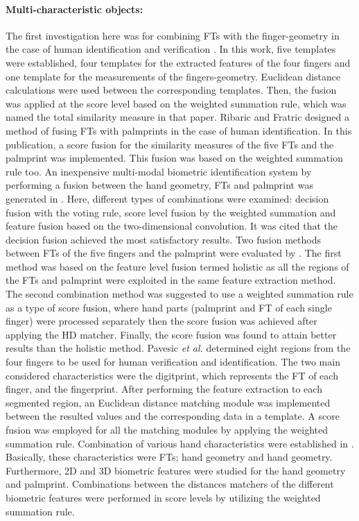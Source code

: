 \documentclass[review]{elsarticle}
\begin{document}
	\paragraph{\textbf{Multi-characteristic objects:}} The first investigation here was for combining FTs with the finger-geometry in the case of human identification and verification \cite{Ribaric2005Anonline}. In this work, five templates were established, four templates for the extracted features of the four fingers and one template for the measurements of the fingers-geometry. Euclidean distance calculations were used between the corresponding templates. Then, the fusion was applied at the score level based on the weighted summation rule, which was named the total similarity measure in that paper. Ribaric and Fratric \cite{Ribaric2005ABiometric} designed a method of fusing FTs with palmprints in the case of human identification. In this publication, a score fusion for the similarity measures of the five FTs and the palmprint was implemented. This fusion was based on the weighted summation rule too. An inexpensive multi-modal biometric identification system by performing a fusion between the hand geometry, FTs and palmprint was generated in \cite{Ferrer2007Low}. Here, different types of combinations were examined: decision fusion with the voting rule, score level fusion by the weighted summation and feature fusion based on the two-dimensional convolution. It was cited that the decision fusion achieved the most satisfactory results. Two fusion methods between FTs of the five fingers and the palmprint were evaluated by \cite{ying2007identity}. The first method was based on the feature level fusion termed holistic as all the regions of the FTs and palmprint were exploited in the same feature extraction method. The second combination method was suggested to use a weighted summation rule as a type of score fusion, where hand parts (palmprint and FT of each single finger) were processed separately then the score fusion was achieved after applying the HD matcher. Finally, the score fusion was found to attain better results than the holistic method. Pavesic \textit{et al.} \cite{Pavesic2009Finger-based} determined eight regions from the four fingers to be used for human verification and identification. The two main considered characteristics were the digitprint, which represents the FT of each finger, and the fingerprint. After performing the feature extraction to each segmented region, an Euclidean distance matching module was implemented between the resulted values and the corresponding data in a template. A score fusion was employed for all the matching modules by applying the weighted summation rule. Combination of various hand characteristics were established in \cite{Kanhangad2011AUnified}. Basically, these characteristics were FTs; hand geometry and hand geometry. Furthermore, 2D and 3D biometric features were studied for the hand geometry and palmprint. Combinations between the distances matchers of the different biometric features were performed in score levels by utilizing the weighted summation rule. 
\end{document}
